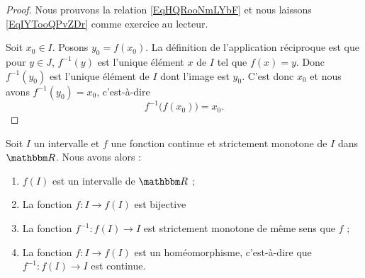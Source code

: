 \begin{proof}
    Nous prouvons la relation \eqref{EqHQRooNmLYbF} et nous laissons \eqref{EqIYTooQPvZDr} comme exercice au lecteur.

    Soit \( x_0\in I\). Posons \( y_0=f(x_0)\). La définition de l'application réciproque est que pour \( y\in J\), \( f^{-1}(y)\) est l'unique élément \( x\) de \( I\) tel que \( f(x)=y\). Donc \( f^{-1}(y_0)\) est l'unique élément de \( I\) dont l'image est \( y_0\). C'est donc \( x_0\) et nous avons \( f^{-1}(y_0)=x_0\), c'est-à-dire
    \begin{equation}
        f^{-1}\big( f(x_0) \big)=x_0.
    \end{equation}
\end{proof}

\begin{theorem} \label{ThoKBRooQKXThd}
    Soit $I$ un intervalle et $f$ une fonction continue et strictement monotone de $I$ dans \( \eR\). Nous avons alors :
    \begin{enumerate}
        \item
            $f(I)$ est un intervalle de \( \eR\) ;
        \item       \label{ITEMooMAWXooZXmVwA}
            La fonction \( f\colon I\to f(I)\) est bijective
        \item
            La fonction \( f^{-1}\colon f(I)\to I\) est strictement monotone de même sens que $f$ ;
        \item \label{ItemEJZooKuFoeFiv}
            La fonction \( f\colon I\to f(I)\) est un homéomorphisme, c'est-à-dire que \( f^{-1}\colon f(I)\to I\) est continue.
    \end{enumerate}
\end{theorem}

